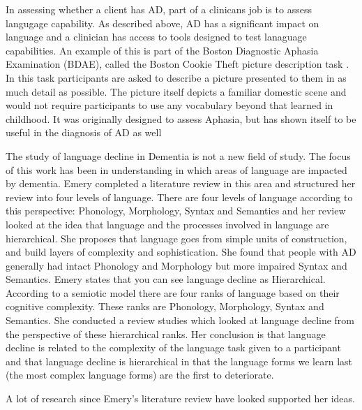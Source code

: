 \documentclass[a4paper]{article}
\begin{document}
\par
In assessing whether a client has AD, part of a clinicans job is to assess langugage capability. As described above, AD has a significant impact on language and a clinician has access to tools designed to test lanaguage capabilities. An example of this is part of the Boston Diagnostic Aphasia Examination (BDAE), called the Boston Cookie Theft picture description task \cite{} . In this task participants are asked to describe a picture presented to them in as much detail as possible. The picture itself depicts a familiar domestic scene and would not require participants to use any vocabulary beyond that learned in childhood. It was originally designed to assess Aphasia, but has shown itself to be useful in the diagnosis of AD as well \cite{GilesPattersonHodges1995}\newline
\par
The study of language decline in Dementia is not a new field of study. The focus of this work has been in understanding in which areas of language are impacted by dementia. Emery \cite{Emery2000} completed a literature review in this area and structured her review into four levels of language. There are four levels of language according to this perspective: Phonology, Morphology, Syntax and Semantics and her review looked at the idea that language and the processes involved in language are hierarchical. She proposes that language goes from simple units of construction, and build layers of complexity and sophistication. She found that people with AD generally had intact Phonology and Morphology but more impaired Syntax and Semantics. Emery states that you can see language decline as Hierarchical. According to a semiotic model there are four ranks of language based on their cognitive complexity. These ranks are Phonology, Morphology, Syntax and Semantics. She conducted a review studies which looked at language decline from the perspective of these hierarchical ranks. Her conclusion is that language decline is related to the complexity of the language task given to a participant and that language decline is hierarchical in that the language forms we learn last (the most complex language forms) are the first to deteriorate.\newline
\par
A lot of research since Emery's literature review \cite{Emery2000} have looked supported her ideas. \newline
\par
\end{document}
